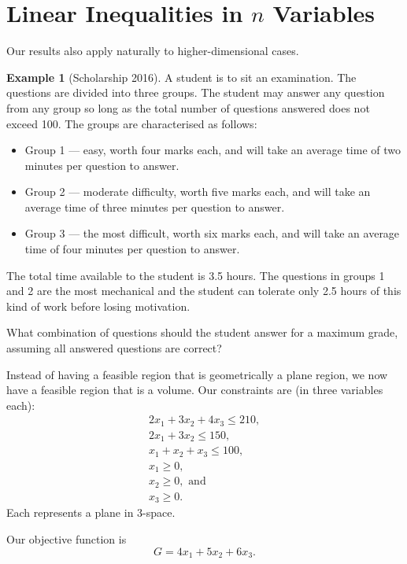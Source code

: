\documentclass[a4paper,leqno]{article}
\numberwithin{equation}{section}
\theoremstyle{definition}
\newtheorem{ex}[equation]{Example}
\theoremstyle{remark}
\begin{document}
\section{Linear Inequalities in $ n $ Variables}
Our results also apply naturally to higher-dimensional cases.
\begin{ex}[Scholarship 2016]
  A student is to sit an examination. The questions are divided into three groups. The student may
  answer any question from any group so long as the total number of questions answered does not
  exceed 100. The groups are characterised as follows:
  \begin{itemize}
    \item Group 1 --- easy, worth four marks each, and will take an average time of two minutes per
          question to answer.
    \item Group 2 --- moderate difficulty, worth five marks each, and will take an average time of three
          minutes per question to answer.
    \item Group 3 --- the most difficult, worth six marks each, and will take an average time of four
          minutes per question to answer.
  \end{itemize}
  The total time available to the student is 3.5 hours. The questions in groups 1 and 2 are the most mechanical
  and the student can tolerate only 2.5 hours of this kind of work before losing motivation.

  What combination of questions should the student answer for a maximum grade, assuming all answered questions are correct?
\end{ex}

Instead of having a feasible region that is geometrically a plane region, we now have a feasible region that is a volume. Our constraints
are (in three variables each):
\begin{gather}
  2x_1 + 3x_2 + 4x_3 \leq 210, \tag{L1} \\
  2x_1 + 3x_2 \leq 150, \tag{L2} \\
  x_1 + x_2 + x_3 \leq 100, \tag{L3} \\
  x_1 \geq 0, \tag{L4} \\
  x_2 \geq 0, \text{ and} \tag{L5}\\
  x_3 \geq 0. \tag{L6}
\end{gather}
Each represents a plane in 3-space.

Our objective function is
\begin{equation}
  G = 4x_1 + 5x_2 + 6x_3.
\end{equation}
\end{document}

